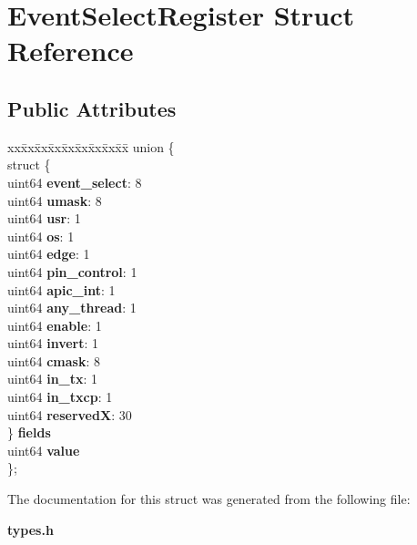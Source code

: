 \section{Event\+Select\+Register Struct Reference}
\label{structEventSelectRegister}
\subsection*{Public Attributes}
\begin{DoxyCompactItemize}
\item 
\begin{tabbing}
xx\=xx\=xx\=xx\=xx\=xx\=xx\=xx\=xx\=\kill
union \{\\
\>struct \{\\
\>\>uint64 {\bfseries event\_select}: 8\\
\>\>uint64 {\bfseries umask}: 8\\
\>\>uint64 {\bfseries usr}: 1\\
\>\>uint64 {\bfseries os}: 1\\
\>\>uint64 {\bfseries edge}: 1\\
\>\>uint64 {\bfseries pin\_control}: 1\\
\>\>uint64 {\bfseries apic\_int}: 1\\
\>\>uint64 {\bfseries any\_thread}: 1\\
\>\>uint64 {\bfseries enable}: 1\\
\>\>uint64 {\bfseries invert}: 1\\
\>\>uint64 {\bfseries cmask}: 8\\
\>\>uint64 {\bfseries in\_tx}: 1\\
\>\>uint64 {\bfseries in\_txcp}: 1\\
\>\>uint64 {\bfseries reservedX}: 30\\
\>\} {\bfseries fields}\\
\>uint64 {\bfseries value}\\
\}; \label{structEventSelectRegister_a86bb381e9495dec15d9489877b492db4}
\\

\end{tabbing}\end{DoxyCompactItemize}


The documentation for this struct was generated from the following file\+:\begin{DoxyCompactItemize}
\item 
{\bf types.\+h}\end{DoxyCompactItemize}
